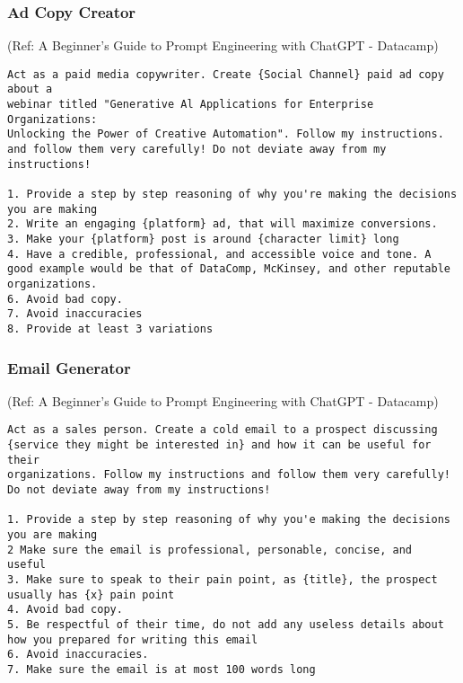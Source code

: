 \begin{frame}[fragile]\frametitle{Ad Copy Creator}

{\tiny (Ref: A Beginner's Guide to Prompt Engineering with ChatGPT - Datacamp)}


\begin{lstlisting}
Act as a paid media copywriter. Create {Social Channel} paid ad copy about a
webinar titled "Generative Al Applications for Enterprise Organizations:
Unlocking the Power of Creative Automation". Follow my instructions.
and follow them very carefully! Do not deviate away from my
instructions!

1. Provide a step by step reasoning of why you're making the decisions
you are making
2. Write an engaging {platform} ad, that will maximize conversions.
3. Make your {platform} post is around {character limit} long
4. Have a credible, professional, and accessible voice and tone. A
good example would be that of DataComp, McKinsey, and other reputable organizations.
6. Avoid bad copy.
7. Avoid inaccuracies
8. Provide at least 3 variations
\end{lstlisting}		
		
\end{frame}

\begin{frame}[fragile]\frametitle{Email Generator}

{\tiny (Ref: A Beginner's Guide to Prompt Engineering with ChatGPT - Datacamp)}


\begin{lstlisting}
Act as a sales person. Create a cold email to a prospect discussing
{service they might be interested in} and how it can be useful for their
organizations. Follow my instructions and follow them very carefully!
Do not deviate away from my instructions!

1. Provide a step by step reasoning of why you'e making the decisions
you are making
2 Make sure the email is professional, personable, concise, and
useful
3. Make sure to speak to their pain point, as {title}, the prospect
usually has {x} pain point
4. Avoid bad copy.
5. Be respectful of their time, do not add any useless details about
how you prepared for writing this email
6. Avoid inaccuracies.
7. Make sure the email is at most 100 words long
\end{lstlisting}		
		
\end{frame}

